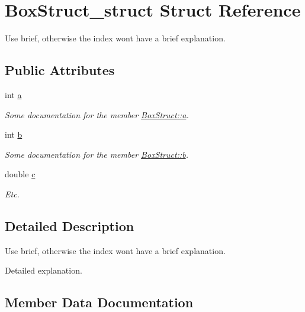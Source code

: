 \hypertarget{structBoxStruct__struct}{}\section{Box\+Struct\+\_\+struct Struct Reference}
\label{structBoxStruct__struct}


Use brief, otherwise the index won\textquotesingle{}t have a brief explanation.  


\subsection*{Public Attributes}
\begin{DoxyCompactItemize}
\item 
int \hyperlink{structBoxStruct__struct_a4593938c5e90f024e7971bdb1392d9d6}{a}
\begin{DoxyCompactList}\small\item\em Some documentation for the member \hyperlink{structBoxStruct__struct_a4593938c5e90f024e7971bdb1392d9d6}{Box\+Struct\+::a}. \end{DoxyCompactList}\item 
int \hyperlink{structBoxStruct__struct_aee44748dc579c5d794853ee8b133d197}{b}
\begin{DoxyCompactList}\small\item\em Some documentation for the member \hyperlink{structBoxStruct__struct_aee44748dc579c5d794853ee8b133d197}{Box\+Struct\+::b}. \end{DoxyCompactList}\item 
double \hyperlink{structBoxStruct__struct_a4543370ed67b2cf5ae3f55201bea11e6}{c}
\begin{DoxyCompactList}\small\item\em Etc. \end{DoxyCompactList}\end{DoxyCompactItemize}


\subsection{Detailed Description}
Use brief, otherwise the index won\textquotesingle{}t have a brief explanation. 

Detailed explanation. 

\subsection{Member Data Documentation}
